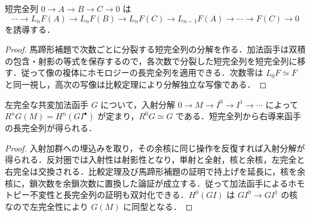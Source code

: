 \begin{prop}[左導来函手の長完全列]
短完全列 $0\to A\to B\to C\to0$ は
\[
\cdots\to L_nF(A)\to L_nF(B)\to L_nF(C)\to L_{n-1}F(A)\to\cdots\to F(C)\to0
\]
を誘導する．
\end{prop}
\begin{proof}
馬蹄形補題で次数ごとに分裂する短完全列の分解を作る．加法函手は双積の包含・射影の等式を保存するので，各次数で分裂した短完全列を短完全列に移す．従って像の複体にホモロジーの長完全列を適用できる．次数零は $L_0F\simeq F$ と同一視し，高次の写像は比較定理により分解独立な写像である．
\end{proof}
\begin{prop}[右導来函手]
左完全な共変加法函手 $G$ について，入射分解 $0\to M\to I^0\to I^1\to\cdots$ によって $R^nG(M)=H^n(GI^\bullet)$ が定まり，$R^0G\simeq G$ である．短完全列から右導来函手の長完全列が得られる．
\end{prop}
\begin{proof}
入射加群への埋込みを取り，その余核に同じ操作を反復すれば入射分解が得られる．反対圏では入射性は射影性となり，単射と全射，核と余核，左完全と右完全は交換される．比較定理及び馬蹄形補題の証明で持上げを延長に，核を余核に，鎖次数を余鎖次数に置換した論証が成立する．従って加法函手によるホモトピー不変性と長完全列の証明も双対化できる．$H^0(GI)$ は $GI^0\to GI^1$ の核なので左完全性により $G(M)$ に同型となる．
\end{proof}
